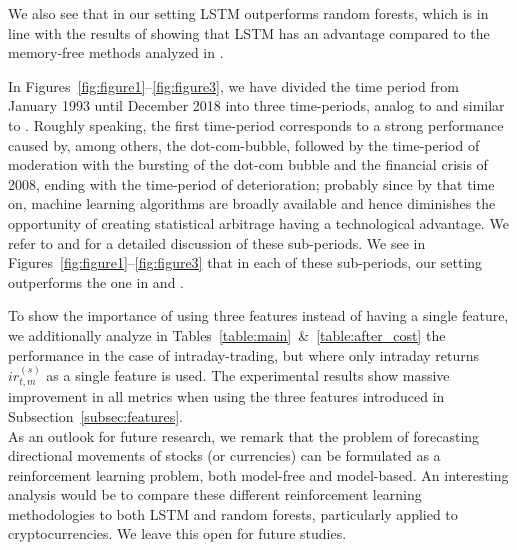 \documentclass[review]{elsarticle}
\begin{document}
We also see that in our setting LSTM outperforms random forests, which is in line with the results of \cite{krauss18} showing that LSTM has an advantage compared to the  memory-free methods analyzed in \cite{krauss17}.

In Figures~\ref{fig:figure1}--\ref{fig:figure3}, we have divided the time period from January 1993 until December 2018 into three time-periods, analog to \cite{krauss18} and similar to \cite{krauss17}. Roughly speaking, the first time-period corresponds to a strong performance caused by, among others, the dot-com-bubble, followed by the time-period of moderation with the bursting of the dot-com bubble and the financial crisis of 2008, ending with the time-period of deterioration; probably since by that time on, machine learning algorithms are broadly available and hence diminishes the opportunity of creating statistical arbitrage having a technological advantage. We refer to \cite{krauss17} and \cite{krauss18} for a detailed discussion of these sub-periods. We see in Figures~\ref{fig:figure1}--\ref{fig:figure3} that in each of these sub-periods, our setting outperforms the one in \cite{krauss17} and \cite{krauss18}.


To show the importance of using three features instead of having a single feature, we additionally analyze in Tables~\ref{table:main}~\&~\ref{table:after_cost} the performance in the case of intraday-trading, but where only intraday returns $ir_{t,m}^{(s)}$ as a single feature is used.  
The experimental results show massive improvement in all metrics when using the three features introduced in Subsection~\ref{subsec:features}.
\\

As an outlook for future research, we remark  that the problem of forecasting directional movements of stocks (or currencies)  can be formulated as a reinforcement learning problem, both model-free and model-based. An interesting analysis would be to compare these different reinforcement learning methodologies to both LSTM and random forests, particularly applied to cryptocurrencies. We leave this open for future studies.
\end{document}
